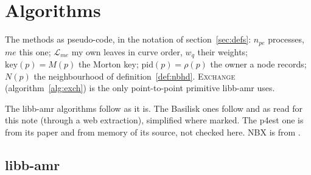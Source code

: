 \clearpage
\section{Algorithms}
\label{sec:algorithms}

The methods as pseudo-code, in the notation of section~\ref{sec:defs}:
$n_{pe}$ processes, $me$ this one; $\mathcal{L}_{me}$ my own leaves in curve
order, $w_q$ their weights; $\mathrm{key}(p) = M(p)$ the Morton key;
$\mathrm{pid}(p) = \rho(p)$ the owner a node records; $N(p)$ the
neighbourhood of definition~\ref{def:nbhd}. \textsc{Exchange} (algorithm~\ref{alg:exch})
is the only point-to-point primitive libb-amr uses.

The libb-amr algorithms follow  as it is. The Basilisk ones
follow  and  as read for this note (through a
web extraction), simplified where marked. The p4est one is from its paper
\cite{p4est} and from memory of its source, not checked here. NBX is from
\cite{nbx}.

\subsection{libb-amr}


